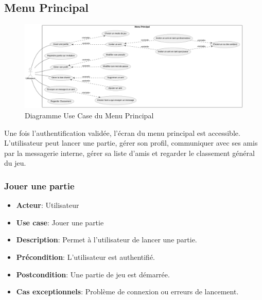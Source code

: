 \documentclass{article}
\begin{document}
\newpage

\subsection{Menu Principal}

\begin{figure}[!h]
    \centering
    \includegraphics[width=1\textwidth]{uml/usescase/menu-principal/menu_principal.png}
    \caption{Diagramme Use Case du Menu Principal}
    \label{fig:main-menu}
\end{figure}

Une fois l'authentification validée, l'écran du menu principal est accessible. L'utilisateur peut lancer une partie, gérer son profil, communiquer avec ses amis par la messagerie interne, gérer sa liste d'amis et regarder le classement général du jeu.

\subsubsection*{Jouer une partie}
\begin{itemize}
    \item \textbf{Acteur}: Utilisateur
    \item \textbf{Use case}: Jouer une partie
    \item \textbf{Description}: Permet à l'utilisateur de lancer une partie.
    \item \textbf{Précondition}: L'utilisateur est authentifié.
    \item \textbf{Postcondition}: Une partie de jeu est démarrée.
    \item \textbf{Cas exceptionnels}: Problème de connexion ou erreurs de lancement.
\end{itemize}
\end{document}
